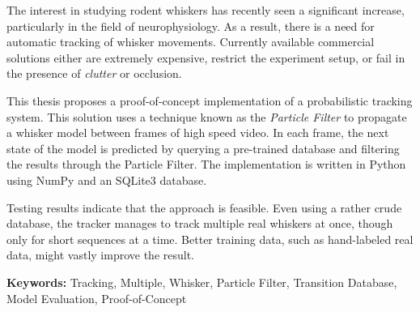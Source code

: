 The interest in studying rodent whiskers has recently seen a significant increase, 
particularly in the field of neurophysiology. As a result, there is a need for automatic 
tracking of whisker movements. Currently available commercial solutions either are 
extremely expensive, restrict the experiment setup, or fail in the presence of 
\emph{clutter} or occlusion. 

This thesis proposes a proof-of-concept implementation of a probabilistic tracking system. 
This solution uses a technique known as the \emph{Particle Filter} to propagate a whisker model between frames of high speed video. 
In each frame, the next state of the model is predicted by querying a pre-trained database and filtering the results 
through the Particle Filter. The implementation is written in Python using NumPy and an SQLite3 database.

Testing results indicate that the approach is feasible. Even using a
rather crude database, the tracker manages to track multiple real
whiskers at once, though only for short sequences at a time. Better
training data, such as hand-labeled real data, might vastly improve
the result.

\textbf{Keywords:} Tracking, Multiple, Whisker, Particle Filter, Transition Database, Model Evaluation, Proof-of-Concept

